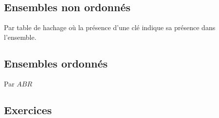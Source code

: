 \documentclass[../../../main.tex]{subfiles}
\begin{document}
\subsection{Ensembles non ordonnés}
Par table de hachage où la présence d'une clé indique sa présence dans l'ensemble.
\subsection{Ensembles ordonnés}
Par $ABR$
\subsection{Exercices}
\end{document}
